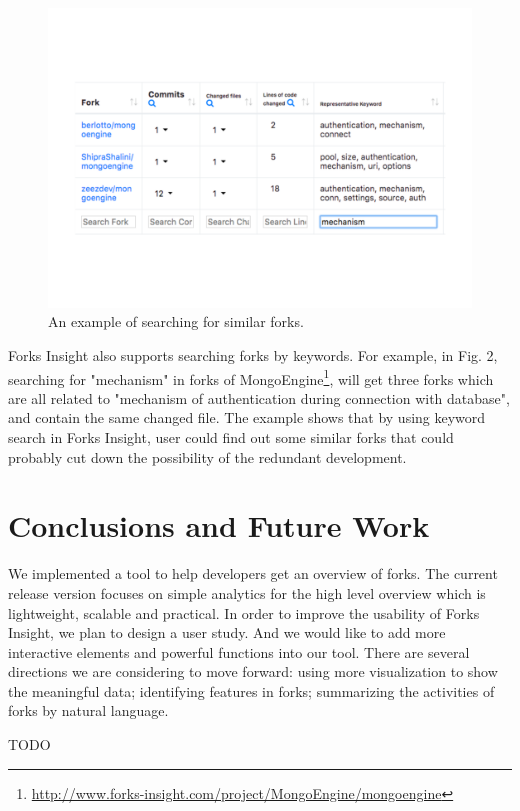 \begin{figure}[]
\centering
\includegraphics[scale=0.3]{pic5.pdf}
\caption{An example of searching for similar forks.}
\vspace{-12pt}
\end{figure}
Forks Insight also supports searching forks by keywords. For example, in Fig. 2, searching for "mechanism" in forks of MongoEngine\footnote{\url{http://www.forks-insight.com/project/MongoEngine/mongoengine}}, will get three forks which are all related to "mechanism of authentication during connection with database", and contain the same changed file. The example shows that by using keyword search in Forks Insight, user could find out some similar forks that could probably cut down the possibility of the redundant development.

\section{Conclusions and Future Work}
We implemented a tool to help developers get an overview of forks. The current release version focuses on simple analytics for the high level overview which is lightweight, scalable and practical. In order to improve the usability of Forks Insight, we plan to design a user study. And we would like to add more interactive elements and powerful functions into our tool. There are several directions we are considering to move forward: using more visualization to show the meaningful data; identifying features in forks; summarizing the activities of forks by natural language.

\begin{acks}
  TODO
\end{acks}


